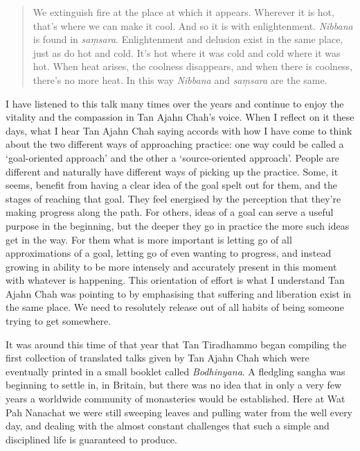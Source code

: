 \begin{quotation}
We extinguish fire at the place at which it appears. Wherever it is hot,
that's where we can make it cool. And so it is with enlightenment.
\emph{Nibbana} is found in \emph{saṃsara}. Enlightenment and delusion
exist in the same place, just as do hot and cold. It's hot where it was
cold and cold where it was hot. When heat arises, the coolness
disappears, and when there is coolness, there's no more heat. In this
way \emph{Nibbana} and \emph{saṃsara} are the same.
\end{quotation}

I have listened to this talk many times over the years and continue to
enjoy the vitality and the compassion in Tan Ajahn Chah's voice. When I
reflect on it these days, what I hear Tan Ajahn Chah saying accords with
how I have come to think about the two different ways of approaching
practice: one way could be called a `goal-oriented approach' and the
other a `source-oriented approach'. People are different and naturally
have different ways of picking up the practice. Some, it seems, benefit
from having a clear idea of the goal spelt out for them, and the stages
of reaching that goal. They feel energised by the perception that
they're making progress along the path. For others, ideas of a goal can
serve a useful purpose in the beginning, but the deeper they go in
practice the more such ideas get in the way. For them what is more
important is letting go of all approximations of a goal, letting go of
even wanting to progress, and instead growing in ability to be more
intensely and accurately present in this moment with whatever is
happening. This orientation of effort is what I understand Tan Ajahn
Chah was pointing to by emphasising that suffering and liberation exist
in the same place. We need to resolutely release out of all habits of
being someone trying to get somewhere.

It was around this time of that year that Tan Tiradhammo began compiling
the first collection of translated talks given by Tan Ajahn Chah which
were eventually printed in a small booklet called \emph{Bodhinyana}. A
fledgling sangha was beginning to settle in, in Britain, but there was
no idea that in only a very few years a worldwide community of
monasteries\cite{forestsangha} would be established. Here
at Wat Pah Nanachat we were still sweeping leaves and pulling water from
the well every day, and dealing with the almost constant challenges that
such a simple and disciplined life is guaranteed to produce.


